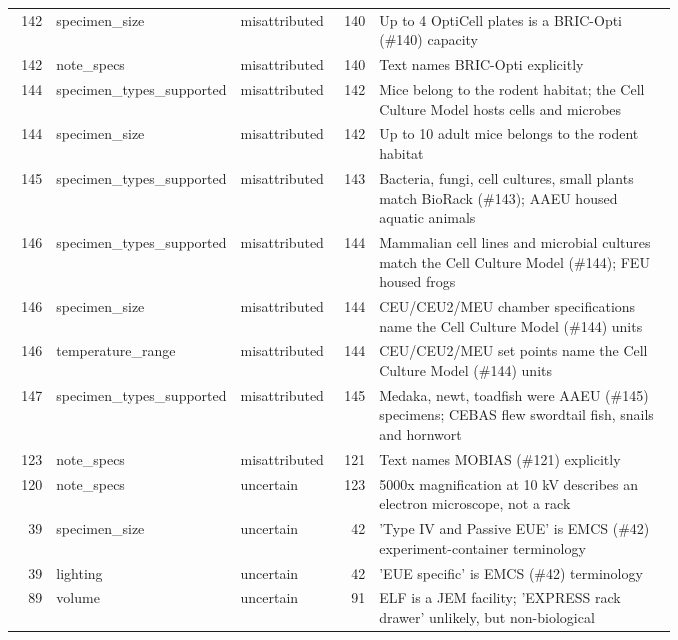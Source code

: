 \begin{longtable}{r>{\raggedright\arraybackslash}p{0.2\linewidth}>{\raggedright\arraybackslash}p{0.12\linewidth}r>{\raggedright\arraybackslash}p{0.45\linewidth}}
142 & specimen\_\allowbreak{}size & misattributed & 140 & Up to 4 OptiCell plates is a BRIC-Opti (\#140) capacity \\
142 & note\_\allowbreak{}specs & misattributed & 140 & Text names BRIC-Opti explicitly \\
144 & specimen\_\allowbreak{}types\_\allowbreak{}supported & misattributed & 142 & Mice belong to the rodent habitat; the Cell Culture Model hosts cells and microbes \\
144 & specimen\_\allowbreak{}size & misattributed & 142 & Up to 10 adult mice belongs to the rodent habitat \\
145 & specimen\_\allowbreak{}types\_\allowbreak{}supported & misattributed & 143 & Bacteria, fungi, cell cultures, small plants match BioRack (\#143); AAEU housed aquatic animals \\
146 & specimen\_\allowbreak{}types\_\allowbreak{}supported & misattributed & 144 & Mammalian cell lines and microbial cultures match the Cell Culture Model (\#144); FEU housed frogs \\
146 & specimen\_\allowbreak{}size & misattributed & 144 & CEU/CEU2/MEU chamber specifications name the Cell Culture Model (\#144) units \\
146 & temperature\_\allowbreak{}range & misattributed & 144 & CEU/CEU2/MEU set points name the Cell Culture Model (\#144) units \\
147 & specimen\_\allowbreak{}types\_\allowbreak{}supported & misattributed & 145 & Medaka, newt, toadfish were AAEU (\#145) specimens; CEBAS flew swordtail fish, snails and hornwort \\
123 & note\_\allowbreak{}specs & misattributed & 121 & Text names MOBIAS (\#121) explicitly \\
120 & note\_\allowbreak{}specs & uncertain & 123 & 5000x magnification at 10 kV describes an electron microscope, not a rack \\
39 & specimen\_\allowbreak{}size & uncertain & 42 & 'Type IV and Passive EUE' is EMCS (\#42) experiment-container terminology \\
39 & lighting & uncertain & 42 & 'EUE specific' is EMCS (\#42) terminology \\
89 & volume & uncertain & 91 & ELF is a JEM facility; 'EXPRESS rack drawer' unlikely, but non-biological \\
\bottomrule
\end{longtable}
\normalsize
